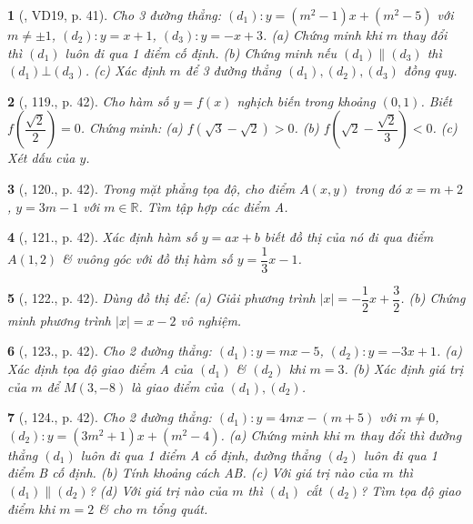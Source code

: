 \documentclass{article}
\newtheorem{baitoan}{}
\begin{document}
\begin{baitoan}[\cite{Tuyen_Toan_9_old}, VD19, p. 41]
	Cho 3 đường thẳng: $(d_1):y = (m^2 - 1)x + (m^2 - 5)$ với $m\ne\pm1$, $(d_2):y = x + 1$, $(d_3):y = -x + 3$. (a) Chứng minh khi $m$ thay đổi thì $(d_1)$ luôn đi qua 1 điểm cố định. (b) Chứng minh nếu $(d_1)\parallel(d_3)$ thì $(d_1)\bot(d_3)$. (c) Xác định $m$ để 3 đường thẳng $(d_1),(d_2),(d_3)$ đồng quy.
\end{baitoan}

\begin{baitoan}[\cite{Tuyen_Toan_9_old}, 119., p. 42]
	Cho hàm số $y = f(x)$ nghịch biến trong khoảng $(0,1)$. Biết $f\left(\dfrac{\sqrt{2}}{2}\right) = 0$. Chứng minh: (a) $f(\sqrt{3} - \sqrt{2}) > 0$. (b) $f\left(\sqrt{2} - \dfrac{\sqrt{2}}{3}\right) < 0$. (c) Xét dấu của $y$.
\end{baitoan}

\begin{baitoan}[\cite{Tuyen_Toan_9_old}, 120., p. 42]
	Trong mặt phẳng tọa độ, cho điểm $A(x,y)$ trong đó $x = m + 2$, $y = 3m - 1$ với $m\in\mathbb{R}$. Tìm tập hợp các điểm A.
\end{baitoan}

\begin{baitoan}[\cite{Tuyen_Toan_9_old}, 121., p. 42]
	Xác định hàm số $y = ax + b$ biết đồ thị của nó đi qua điểm $A(1,2)$ \& vuông góc với đồ thị hàm số $y = \dfrac{1}{3}x - 1$.
\end{baitoan}

\begin{baitoan}[\cite{Tuyen_Toan_9_old}, 122., p. 42]
	Dùng đồ thị để: (a) Giải phương trình $|x| = -\dfrac{1}{2}x + \dfrac{3}{2}$. (b) Chứng minh phương trình $|x| = x - 2$ vô nghiệm.
\end{baitoan}

\begin{baitoan}[\cite{Tuyen_Toan_9_old}, 123., p. 42]
	Cho 2 đường thẳng: $(d_1): y = mx - 5$, $(d_2):y = -3x + 1$. (a) Xác định tọa độ giao điểm A của $(d_1)$ \& $(d_2)$ khi $m = 3$. (b) Xác định giá trị của $m$ để $M(3,-8)$ là giao điểm của $(d_1),(d_2)$.
\end{baitoan}

\begin{baitoan}[\cite{Tuyen_Toan_9_old}, 124., p. 42]
	Cho 2 đường thẳng: $(d_1):y = 4mx - (m + 5)$ với $m\ne0$, $(d_2):y = (3m^2 + 1)x + (m^2 - 4)$. (a) Chứng minh khi $m$ thay đổi thì đường thẳng $(d_1)$ luôn đi qua 1 điểm A cố định, đường thẳng $(d_2)$ luôn đi qua 1 điểm B cố định. (b) Tính khoảng cách AB. (c) Với giá trị nào của $m$ thì $(d_1)\parallel(d_2)$? (d) Với giá trị nào của $m$ thì $(d_1)$ cắt $(d_2)$? Tìm tọa độ giao điểm khi $m = 2$ \& cho $m$ tổng quát.
\end{baitoan}
\end{document}
